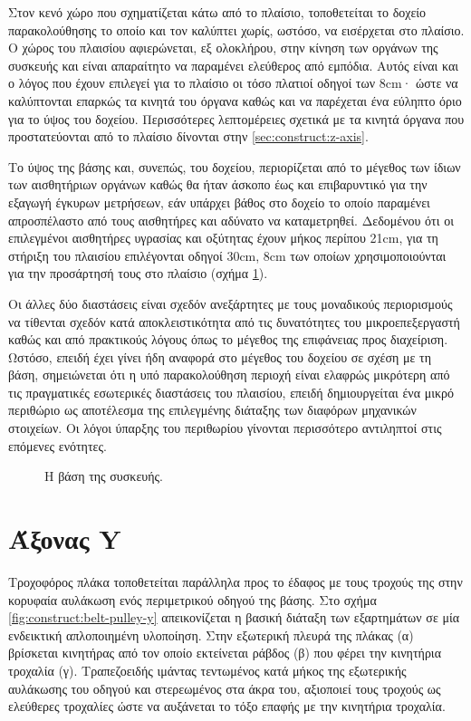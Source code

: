 Στον κενό χώρο που σχηματίζεται κάτω από το πλαίσιο, τοποθετείται το δοχείο
παρακολούθησης το οποίο και τον καλύπτει χωρίς, ωστόσο, να εισέρχεται στο
πλαίσιο. Ο χώρος του πλαισίου αφιερώνεται, εξ ολοκλήρου, στην κίνηση των οργάνων
της συσκευής και είναι απαραίτητο να παραμένει ελεύθερος από εμπόδια. Αυτός
είναι και ο λόγος που έχουν επιλεγεί για το πλαίσιο οι τόσο πλατιοί οδηγοί των
8cm· ώστε να καλύπτονται επαρκώς τα κινητά του όργανα καθώς και να παρέχεται ένα
εύληπτο όριο για το ύψος του δοχείου. Περισσότερες λεπτομέρειες σχετικά με τα
κινητά όργανα που προστατεύονται από το πλαίσιο δίνονται στην
\ref{sec:construct:z-axis}.

Το ύψος της βάσης και, συνεπώς, του δοχείου, περιορίζεται από το μέγεθος των
ίδιων των αισθητήριων οργάνων καθώς θα ήταν άσκοπο έως και επιβαρυντικό για την
εξαγωγή έγκυρων μετρήσεων, εάν υπάρχει βάθος στο δοχείο το οποίο παραμένει
απροσπέλαστο από τους αισθητήρες και αδύνατο να καταμετρηθεί.
Δεδομένου ότι οι επιλεγμένοι αισθητήρες υγρασίας και οξύτητας έχουν μήκος
περίπου 21cm, για τη στήριξη του πλαισίου επιλέγονται οδηγοί 30cm, 8cm των
οποίων χρησιμοποιούνται για την προσάρτησή τους στο πλαίσιο (σχήμα
\ref{fig:construct:base}).

Οι άλλες δύο διαστάσεις είναι σχεδόν ανεξάρτητες με τους μοναδικούς περιορισμούς
να τίθενται σχεδόν κατά αποκλειστικότητα από τις δυνατότητες του
μικροεπεξεργαστή καθώς και από πρακτικούς λόγους όπως το μέγεθος της επιφάνειας
προς διαχείριση.
Ωστόσο, επειδή έχει γίνει ήδη αναφορά στο μέγεθος του δοχείου σε σχέση με τη
βάση, σημειώνεται ότι η υπό παρακολούθηση περιοχή είναι ελαφρώς μικρότερη από
τις πραγματικές εσωτερικές διαστάσεις του πλαισίου, επειδή δημιουργείται ένα
μικρό περιθώριο ως αποτέλεσμα της επιλεγμένης διάταξης των διαφόρων μηχανικών
στοιχείων.
Οι λόγοι ύπαρξης του περιθωρίου γίνονται περισσότερο αντιληπτοί στις επόμενες
ενότητες.

\begin{figure}
    \caption{Η βάση της συσκευής. \label{fig:construct:base}}
    \begin{center}%
    \def\svgwidth{\textwidth}
    
    \end{center}
\end{figure}

\section{Άξονας Y}

Τροχοφόρος πλάκα τοποθετείται παράλληλα προς το έδαφος με τους τροχούς της στην
κορυφαία αυλάκωση ενός περιμετρικού οδηγού της βάσης. Στο σχήμα
\ref{fig:construct:belt-pulley-y} απεικονίζεται η βασική διάταξη των εξαρτημάτων
σε μία ενδεικτική απλοποιημένη υλοποίηση.
Στην εξωτερική πλευρά της πλάκας (α) βρίσκεται κινητήρας από τον οποίο
εκτείνεται ράβδος (β) που φέρει την κινητήρια τροχαλία (γ).
Τραπεζοειδής ιμάντας τεντωμένος κατά μήκος της εξωτερικής αυλάκωσης του οδηγού
και στερεωμένος στα άκρα του, αξιοποιεί τους τροχούς ως ελεύθερες τροχαλίες ώστε
να αυξάνεται το τόξο επαφής με την κινητήρια τροχαλία.

